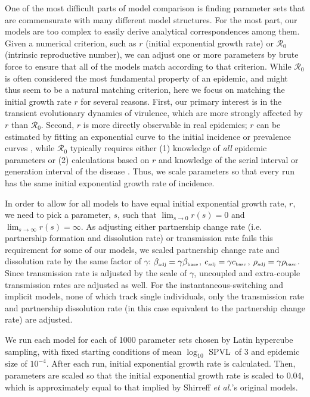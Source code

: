 \documentclass[10pt,letterpaper]{article}
\newcommand{\Lspvl}{$\log_{10}$ SPVL}
\newcommand{\rzero}{{\mathcal R}_0}
\newcommand{\etal}{\textit{et al.}}
\newcommand{\tsub}[2]{#1_{{\textrm{\tiny #2}}}}
\begin{document}
One of the most difficult parts of model comparison is finding
parameter sets that are commensurate with many different model
structures. For the most part, our models are too complex to easily
derive analytical correspondences among them. Given a numerical
criterion, such as $r$ (initial exponential growth rate) or $\rzero$ 
(intrinsic reproductive number), we can adjust one or more
parameters by brute force to ensure that all of the models match
according to that criterion. While $\rzero$ is often considered
the most fundamental property of an epidemic, and might thus seem to
be a natural matching criterion, here we focus on matching the initial
growth rate $r$ for several reasons. First, our primary interest is in
the transient evolutionary dynamics of virulence, which are more
strongly affected by $r$ than $\rzero$. Second, $r$ is 
more directly observable in real epidemics; $r$ can be estimated by
fitting an exponential curve to the initial incidence or
prevalence curves \cite{ma_estimating_2014}, while $\rzero$
typically requires either (1) knowledge of \emph{all} epidemic
parameters or (2) calculations based on
$r$ and knowledge of the serial interval or generation interval of the
disease \cite{wallinga_how_2007}. Thus, we scale parameters so that
every run has the same initial exponential growth rate of incidence.

In order to allow for all models to have equal initial exponential
growth rate, $r$, we need to pick a parameter, $s$, such that
$\lim_{s\to 0} r(s) = 0$ and $\lim_{s\to\infty} r(s) = \infty$. As
adjusting either partnership change rate (i.e. partnership formation
and dissolution rate) or transmission rate fails this requirement for
some of our models, we scaled partnership change rate and
dissolution rate by the same factor of $\gamma$: $\tsub{\beta}{adj} =
\gamma \tsub{\beta}{base}$, $\tsub{c}{adj} = \gamma \tsub{c}{base}$,
$\tsub{\rho}{adj} = \gamma \tsub{\rho}{base}$. Since transmission rate
is adjusted by the scale of $\gamma$, uncoupled and extra-couple
transmission rates are adjusted as well. For the instantaneous-switching
and implicit models, none of which track single individuals, 
only the transmission rate and partnership
dissolution rate (in this case equivalent to the partnership change
rate) are adjusted.

We run each model for each of 1000 parameter sets chosen by Latin hypercube sampling, with fixed starting conditions
of mean \Lspvl\ of 3 and epidemic size of $10^{-4}$. After each run, initial exponential growth rate is calculated. Then, parameters are scaled so that the initial exponential growth rate is scaled to 0.04, which is approximately equal to that implied by Shirreff \etal's original models.
\end{document}
